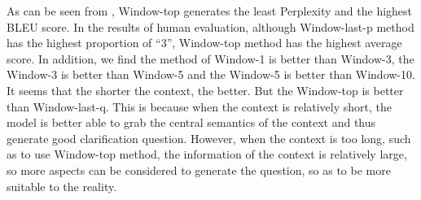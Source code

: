 As can be seen from , Window-top generates the least Perplexity and the 
highest BLEU score. In the results of human evaluation, although Window-last-p method has the highest proportion of ``3'', Window-top method has the highest average score. In addition, we find the method of Window-1 is better than Window-3, the Window-3 is better than Window-5 and the Window-5 is better than Window-10. It seems that the shorter the context, the better. But the Window-top is better than Window-last-q. This is because when the context is relatively short, the model is better able to grab the central semantics of the context and thus generate good clarification question. However, when the context is too long, such as to use Window-top method, the information of the context is relatively large, so more aspects can be considered to generate the question, so as to be more suitable to the reality.

